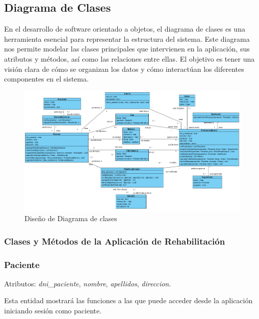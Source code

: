 \documentclass{article}
\begin{document}
\subsection{Diagrama de Clases}

En el desarrollo de software orientado a objetos, el diagrama de clases es una herramienta esencial para representar la estructura del sistema. Este diagrama nos permite modelar las clases principales que intervienen en la aplicación, sus atributos y métodos, así como las relaciones entre ellas. El objetivo es tener una visión clara de cómo se organizan los datos y cómo interactúan los diferentes componentes en el sistema. 

\begin{figure}
	\begin{center} 
		\includegraphics[width=1\textwidth]{images/diagrama_clases.png}
		\caption{Diseño de Diagrama de clases}
		\label{fig:DiagClases}
	\end{center}
\end{figure}
\vspace{5cm}


\subsubsection*{Clases y Métodos de la Aplicación de Rehabilitación}

\subsubsection*{Paciente}

Atributos: \textit{dni\_paciente}, \textit{nombre}, \textit{apellidos}, \textit{direccion}.

Esta entidad mostrará las funciones a las que puede acceder desde la aplicación iniciando sesión como paciente.
\end{document}
